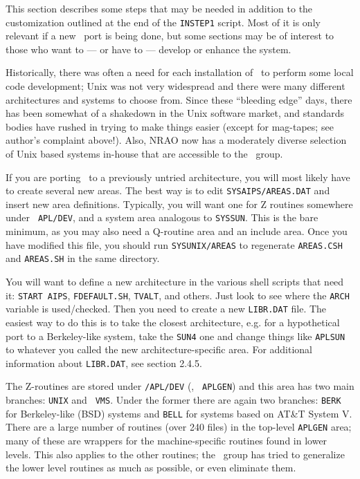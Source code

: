 \medskip
{}

This section describes some steps that may be needed in addition to
the customization outlined at the end of the {\tt INSTEP1} script.
Most of it is only relevant if a new \AIPS\ port is being done, but
some sections may be of interest to those who want to --- or have to
--- develop or enhance the system.\medskip


Historically, there was often a need for each installation of \AIPS\ to
perform some local code development; Unix was not very widespread and
there were many different architectures and systems to choose from.
Since these ``bleeding edge'' days, there has been somewhat of a
shakedown in the Unix software market, and standards bodies have rushed
in trying to make things easier (except for mag-tapes; see author's
complaint above!).  Also, NRAO now has a moderately diverse selection of
Unix based systems in-house that are accessible to the \AIPS\ group.

If you are porting \AIPS\ to a previously untried architecture, you
will most likely have to create several new areas.  The best way is to
edit {\tt\dol SYSAIPS/AREAS.DAT} and insert new area definitions.
Typically, you will want one for Z routines somewhere under {\tt
APL/DEV}, and a system area analogous to {\tt \dol SYSSUN}.  This is the bare
minimum, as you may also need a Q-routine area and an include area.
Once you have modified this file, you should run {\tt \dol SYSUNIX/AREAS}
to regenerate {\tt AREAS.CSH} and {\tt AREAS.SH} in the same directory.

You will want to define a new architecture in the various shell scripts
that need it: {\tt START AIPS}, {\tt FDEFAULT.SH}, {\tt TVALT}, and
others.  Just look to see where the {\tt ARCH} variable is used/checked.
Then you need to create a new {\tt LIBR.DAT} file.  The easiest way to do
this is to take the closest architecture, e.g. for a hypothetical port to
a Berkeley-like system, take the {\tt SUN4} one and change things like
{\tt\dol APLSUN} to whatever you called the new architecture-specific
area.  For additional information about {\tt LIBR.DAT}, see section 2.4.5.

The Z-routines are stored under {\tt\thisver/APL/DEV} (\ie, {\tt
\dol APLGEN}) and this area has two main branches: {\tt UNIX} and {\tt
VMS}.  Under the former there are again two branches: {\tt BERK} for
Berkeley-like (BSD) systems and {\tt BELL} for systems based on AT\&T
System V.  There are a large number of routines (over 240 files) in the
top-level {\tt \dol APLGEN} area; many of these are wrappers for the
machine-specific routines found in lower levels.  This also applies to
the other routines; the \AIPS\ group has tried to generalize the lower
level routines as much as possible, or even eliminate them.

